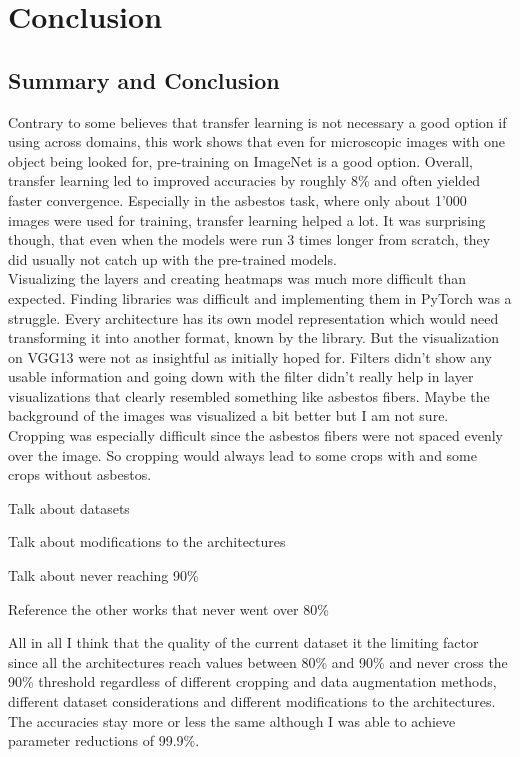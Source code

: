 \chapter{Conclusion}

\section{Summary and Conclusion}

Contrary to some believes that transfer learning is not necessary a good option if using across domains, this work shows that even for microscopic images with one object being looked for, pre-training on ImageNet is a good option. Overall, transfer learning led to improved accuracies by roughly 8\% and often yielded faster convergence. Especially in the asbestos task, where only about 1'000 images were used for training, transfer learning helped a lot. It was surprising though, that even when the models were run 3 times longer from scratch, they did usually not catch up with the pre-trained models.\\

Visualizing the layers and creating heatmaps was much more difficult than expected. Finding libraries was difficult and implementing them in PyTorch was a struggle. Every architecture has its own model representation which would need transforming it into another format, known by the library. But the visualization on VGG13 were not as insightful as initially hoped for. Filters didn't show any usable information and going down with the filter didn't really help in layer visualizations that clearly resembled something like asbestos fibers. Maybe the background of the images was visualized a bit better but I am not sure.\\

Cropping was especially difficult since the asbestos fibers were not spaced evenly over the image. So cropping would always lead to some crops with and some crops without asbestos.

Talk about datasets

Talk about modifications to the architectures

Talk about never reaching 90\%

Reference the other works that never went over 80\%

All in all I think that the quality of the current dataset it the limiting factor since all the architectures reach values between 80\% and 90\% and never cross the 90\% threshold regardless of different cropping and data augmentation methods, different dataset considerations and different modifications to the architectures. The accuracies stay more or less the same although I was able to achieve parameter reductions of 99.9\%.

